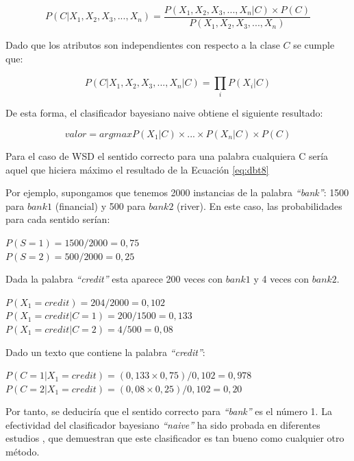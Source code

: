 \begin{itemize}
  \begin{equation}
    P(C|X_1,X_2,X_3,...,X_n)=\frac{P(X_1,X_2,X_3,...,X_n|C)\times P(C)}{P(X_1,X_2,X_3,...,X_n)}
    \label{eq:dbt6}
  \end{equation}

  Dado que los atributos son independientes con respecto a la clase $C$ se cumple que:

  \begin{equation}
    P(C|X_1,X_2,X_3,...,X_n|C)=\prod_{i}^{}P(X_i|C)
    \label{eq:dbt7}
  \end{equation}

  De esta forma, el clasificador bayesiano naive obtiene el siguiente resultado:

  \begin{equation}
    valor=arg max P(X_1|C)\times ... \times P(X_n|C) \times P(C)
    \label{eq:dbt8}
  \end{equation}

  Para el caso de WSD el sentido correcto para una palabra cualquiera C sería aquel que hiciera máximo el resultado de la Ecuación \ref{eq:dbt8}

  Por ejemplo, supongamos que tenemos 2000 instancias de la palabra \textit{“bank”}: 1500 para $bank1$ (financial) y 500 para $bank2$ (river). En este caso, las probabilidades para cada sentido serían:

  \begin{center}
  $P(S=1)=1500/2000=0,75$\\
  $P(S=2)=500/2000=0,25$
  \end{center}

  Dada la palabra \textit{“credit”} esta aparece 200 veces con $bank1$ y 4 veces con $bank2$.

  \begin{center}
    $P(X_1=credit)=204/2000=0,102$\\
    $P(X_1=credit|C=1)=200/1500=0,133$\\
    $P(X_1=credit|C=2)=4/500=0,08$
  \end{center}

  Dado un texto que contiene la palabra \textit{“credit”}:

  \begin{center}
    $P(C=1|X_1=credit)=(0,133 \times 0,75)/0,102=0,978$\\
    $P(C=2|X_1=credit)=(0,08 \times 0,25)/0,102=0,20$
  \end{center}
 
  Por tanto, se deduciría que el sentido correcto para \textit{“bank”} es el número 1. La efectividad del clasificador bayesiano \textit{“naive”} ha sido probada en diferentes estudios \cite{025}, \cite{026} que demuestran que este clasificador es tan bueno como cualquier otro método.


\end{itemize}
